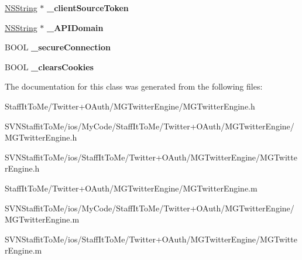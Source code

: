\begin{DoxyCompactItemize}
\item 
\hypertarget{interface_m_g_twitter_engine_a2b00b45457361a956c0f4bdd6954cd7c}{
\hyperlink{class_n_s_string}{\-N\-S\-String} $\ast$ {\bfseries \-\_\-client\-Source\-Token}}
\label{interface_m_g_twitter_engine_a2b00b45457361a956c0f4bdd6954cd7c}

\item 
\hypertarget{interface_m_g_twitter_engine_afa227d3719311f8ad001b15dd530b953}{
\hyperlink{class_n_s_string}{\-N\-S\-String} $\ast$ {\bfseries \-\_\-\-A\-P\-I\-Domain}}
\label{interface_m_g_twitter_engine_afa227d3719311f8ad001b15dd530b953}

\item 
\hypertarget{interface_m_g_twitter_engine_a7ba8cf813544a68de65fb8753920ed72}{
\-B\-O\-O\-L {\bfseries \-\_\-secure\-Connection}}
\label{interface_m_g_twitter_engine_a7ba8cf813544a68de65fb8753920ed72}

\item 
\hypertarget{interface_m_g_twitter_engine_af6f1c0e2c50c6be119908b078488818f}{
\-B\-O\-O\-L {\bfseries \-\_\-clears\-Cookies}}
\label{interface_m_g_twitter_engine_af6f1c0e2c50c6be119908b078488818f}

\end{DoxyCompactItemize}


\-The documentation for this class was generated from the following files\-:\begin{DoxyCompactItemize}
\item 
\-Staff\-It\-To\-Me/\-Twitter+\-O\-Auth/\-M\-G\-Twitter\-Engine/\-M\-G\-Twitter\-Engine.\-h\item 
\-S\-V\-N\-Staffit\-To\-Me/ios/\-My\-Code/\-Staff\-It\-To\-Me/\-Twitter+\-O\-Auth/\-M\-G\-Twitter\-Engine/\-M\-G\-Twitter\-Engine.\-h\item 
\-S\-V\-N\-Staffit\-To\-Me/ios/\-Staff\-It\-To\-Me/\-Twitter+\-O\-Auth/\-M\-G\-Twitter\-Engine/\-M\-G\-Twitter\-Engine.\-h\item 
\-Staff\-It\-To\-Me/\-Twitter+\-O\-Auth/\-M\-G\-Twitter\-Engine/\-M\-G\-Twitter\-Engine.\-m\item 
\-S\-V\-N\-Staffit\-To\-Me/ios/\-My\-Code/\-Staff\-It\-To\-Me/\-Twitter+\-O\-Auth/\-M\-G\-Twitter\-Engine/\-M\-G\-Twitter\-Engine.\-m\item 
\-S\-V\-N\-Staffit\-To\-Me/ios/\-Staff\-It\-To\-Me/\-Twitter+\-O\-Auth/\-M\-G\-Twitter\-Engine/\-M\-G\-Twitter\-Engine.\-m\end{DoxyCompactItemize}
